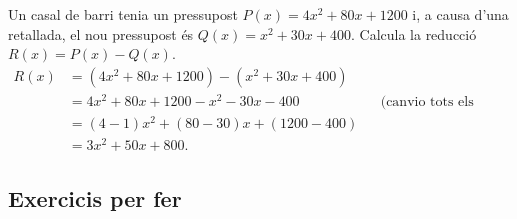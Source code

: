 \begin{exresolt}
Un casal de barri tenia un pressupost $P(x) = 4x^2 + 80x + \num{1200}$ i,
a causa d'una retallada, el nou pressupost és $Q(x) = x^2 + 30x + 400$.
Calcula la reducció $R(x) = P(x) - Q(x)$.
\solucio
\begin{align*}
R(x) &= (4x^2 + 80x + \num{1200}) - (x^2 + 30x + 400) \\
     &= 4x^2 + 80x + \num{1200} - x^2 - 30x - 400
       &&\text{(canvio tots els signes del segon)} \\
     &= (4-1)x^2 + (80-30)x + (\num{1200}-400) \\
     &= 3x^2 + 50x + 800.
\end{align*}
\end{exresolt}

\subsection{Exercicis per fer}

